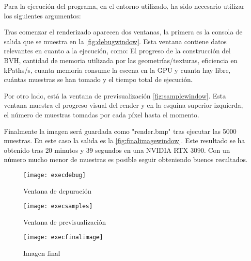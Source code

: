 Para la ejecución del programa, en el entorno utilizado, ha sido necesario utilizar los siguientes argumentos:

Tras comenzar el renderizado aparecen dos ventanas, la primera es la consola de salida que se muestra en la \autoref{fig:debugwindow}. Esta ventana contiene datos relevantes en cuanto a la ejecución, como: El progreso de la construcción del BVH, cantidad de memoria utilizada por las geometrías/texturas, eficiencia en kPaths/s, cuanta memoria consume la escena en la GPU y cuanta hay libre, cuántas muestras se han tomado y el tiempo total de ejecución.

Por otro lado, está la ventana de previsualización \autoref{fig:samplewindow}. Esta ventana muestra el progreso visual del render y en la esquina superior izquierda, el número de muestras tomadas por cada píxel hasta el momento.

Finalmente la imagen será guardada como "render.bmp" tras ejecutar las 5000 muestras. En este caso la salida es la \autoref{fig:finalimagewindow}. Este resultado se ha obtenido tras 20 minutos y 39 segundos en una NVIDIA RTX 3090. Con un número mucho menor de muestras es posible seguir obteniendo buenos resultados.

\begin{figure}[H]
    \centering
	\texttt{[image: execdebug]}
	\caption{Ventana de depuración}
	\label{fig:debugwindow}
\end{figure}

\begin{figure}[H]
    \centering
	\texttt{[image: execsamples]}
	\caption{Ventana de previsualización}
	\label{fig:samplewindow}
\end{figure}

\begin{figure}[H]
    \centering
	\texttt{[image: execfinalimage]}
	\caption{Imagen final}
	\label{fig:finalimagewindow}
\end{figure}
	